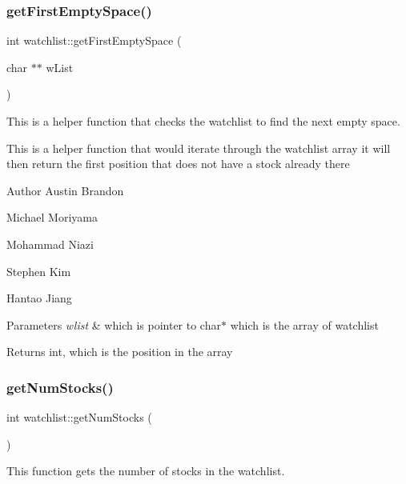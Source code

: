 \subsubsection{\texorpdfstring{get\+First\+Empty\+Space()}{getFirstEmptySpace()}}
{\footnotesize\ttfamily int watchlist\+::get\+First\+Empty\+Space (\begin{DoxyParamCaption}\item[{char $\ast$$\ast$}]{w\+List }\end{DoxyParamCaption})}



This is a helper function that checks the watchlist to find the next empty space. 

This is a helper function that would iterate through the watchlist array it will then return the first position that does not have a stock already there

\begin{DoxyAuthor}{Author}
Austin Brandon 

Michael Moriyama 

Mohammad Niazi 

Stephen Kim 

Hantao Jiang 
\end{DoxyAuthor}

\begin{DoxyParams}{Parameters}
{\em wlist} & which is pointer to char$\ast$ which is the array of watchlist \\
\hline
\end{DoxyParams}
\begin{DoxyReturn}{Returns}
int, which is the position in the array 
\end{DoxyReturn}
\mbox{\label{classwatchlist_acdb445a23fda216d0a3284b3835f33ff}} 
\subsubsection{\texorpdfstring{get\+Num\+Stocks()}{getNumStocks()}}
{\footnotesize\ttfamily int watchlist\+::get\+Num\+Stocks (\begin{DoxyParamCaption}{ }\end{DoxyParamCaption})}



This function gets the number of stocks in the watchlist. 

